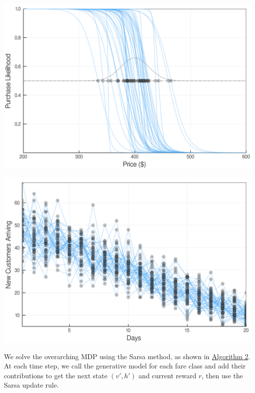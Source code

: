 \documentclass[10pt,letterpaper]{article}
\newenvironment{Figure}
{\par\medskip\noindent\minipage{\linewidth}}
{\endminipage\par\medskip}
\begin{document}
\begin{multicols*}{2}
\begin{Figure}
    \centering
    \includegraphics[width=0.9\linewidth]{plots/customer_price_schedule.png}
	\setlength{\belowcaptionskip}{-10pt}
    \label{fig:pricing-dynamics-example}
\end{Figure}
\vspace*{-0.1in}
\begin{Figure}
    \centering
    \includegraphics[width=0.9\linewidth]{plots/customer_arrival.png}
    \setlength{\belowcaptionskip}{-10pt}
    \label{fig:arrival-dynamics-example}
\end{Figure}

We solve the overarching MDP using the Sarsa method, as shown in \hyperref[alg:solve-mdp]{Algorithm 2}. At each time step, we call the generative model for each fare class and add their contributions to get the next state $(v',h')$ and current reward $r$, then use the Sarsa update rule.


\end{multicols*}
\end{document}
